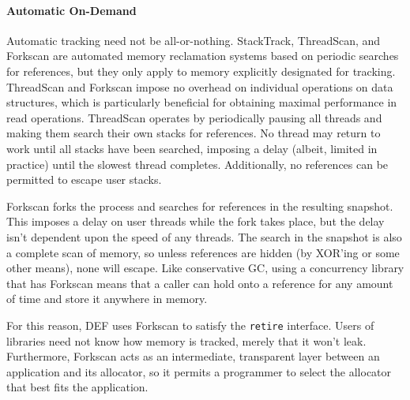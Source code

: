 \paragraph{Automatic On-Demand} Automatic tracking need not be all-or-nothing.  StackTrack\cite{StackTrack}, ThreadScan\cite{Threadscan}, and Forkscan\cite{Forkscan} are automated memory reclamation systems based on periodic searches for references, but they only apply to memory explicitly designated for tracking.  ThreadScan and Forkscan impose no overhead on individual operations on data structures, which is particularly beneficial for obtaining maximal performance in read operations.  ThreadScan operates by periodically pausing all threads and making them search their own stacks for references.  No thread may return to work until all stacks have been searched, imposing a delay (albeit, limited in practice) until the slowest thread completes.  Additionally, no references can be permitted to escape user stacks.

Forkscan forks the process and searches for references in the resulting snapshot.  This imposes a delay on user threads while the fork takes place, but the delay isn't dependent upon the speed of any threads.  The search in the snapshot is also a complete scan of memory, so unless references are hidden (by XOR'ing or some other means), none will escape.  Like conservative GC, using a concurrency library that has Forkscan means that a caller can hold onto a reference for any amount of time and store it anywhere in memory.

For this reason, DEF uses Forkscan to satisfy the \texttt{retire} interface.  Users of libraries need not know how memory is tracked, merely that it won't leak.  Furthermore, Forkscan acts as an intermediate, transparent layer between an application and its allocator, so it permits a programmer to select the allocator that best fits the application.

